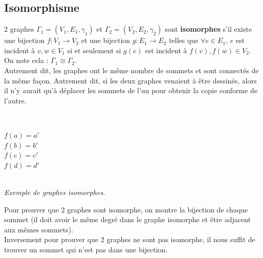 \documentclass[11pt]{article}
\begin{document}
	\subsection{Isomorphisme}
		2 graphes $\Gamma_1 = (V_1,E_1,\gamma_1)$ et $\Gamma_2 = (V_2,E_2,\gamma_2)$ sont \textbf{isomorphes} s'il existe une bijection $f : V_1 \rightarrow V_2$ et une bijection $g : E_1 \rightarrow E_2$ telles que $\forall e \in E_1$, $e$ est incident à $v, w \in V_1$ si et seulement si $g(e)$ est incident à $f(v), f(w) \in V_2$. On note cela : $\Gamma_1 \cong \Gamma_2$. \\ %
		Autrement dit, les graphes ont le même nombre de sommets et sont connectés de la même façon. Autrement dit, si les deux graphes venaient à être dessinés, alors il n'y aurait qu'à déplacer les sommets de l'un pour obtenir la copie conforme de l'autre.\\
		\begin{center}
		\begin{minipage}{0.5\textwidth}
			 \\
			\end{minipage}\hfill
			\begin{minipage}{0.5\textwidth}
			\center
			$f(a) = a'$ \\
			$f(b) = b'$ \\
			$f(c) = c'$ \\
			$f(d) = d'$ 
			\end{minipage}\\
			\textit{Exemple de graphes isomorphes.}
		\end{center}
		
		Pour prouver que 2 graphes sont isomorphe, on montre la bijection de chaque sommet (il doit avoir le même degré dans le graphe isomorphe et être adjacent aux mêmes sommets).\\ %
		Inversement pour prouver que 2 graphes ne sont pas isomorphe, il nous suffit de trouver un sommet qui n'est pas dans une bijection.
	
\end{document}
